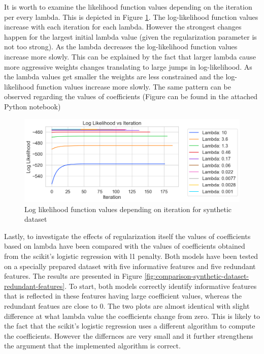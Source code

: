 \documentclass[11pt]{article}
\begin{document}
It is worth to examine the likelihood function values depending on the iteration per every lambda. This is depicted in Figure \ref{fig:log-likelihood-synthetic-dataset}. The log-likelihood function values increase with each iteration for each lambda. However the strongest changes happen for the largest initial lambda value (given the regularization parameter is not too strong). As the lambda decreases the log-likelihood function values increase more slowly. This can be explained by the fact that larger lambda cause more aggressive weights changes translating to large jumps in log-likelihood. As the lambda values get smaller the weights are less constrained and the log-likelihood function values increase more slowly. The same pattern can be observed regarding the values of coefficients (Figure can be found in the attached Python notebook) \par


\begin{figure}
    \centering
  \includegraphics[width=\textwidth]{../results/log_likelihood_synthetic_dataset.png}
    \caption{Log likelihood function values depending on iteration for synthetic dataset}
    \label{fig:log-likelihood-synthetic-dataset}
\end{figure}


Lastly, to investigate the effects of regularization itself the values of coefficients based on lambda have been compared with the values of coefficients obtained from the scikit's logistic regression with l1 penalty. Both models have been tested on a specially prepared dataset with five informative features and five redundant features. The results are presented in Figure \ref{fig:comparison-synthetic-dataset-redundant-features}. To start, both models correctly identify informative features that is reflected in these features having large coefficient values, whereas the redundant featues are close to 0. The two plots are almost identical with slight difference at what lambda value the coefficients change from zero. This is likely to the fact that the scikit's logistic regression uses a different algorithm to compute the coefficients. However the differnces are very small and it further strengthens the argument that the implemented algorithm is correct. \par
\end{document}
